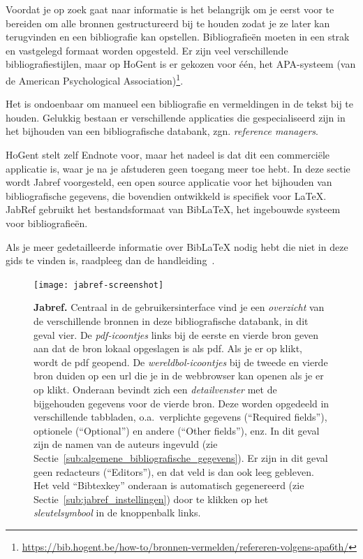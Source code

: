 Voordat je op zoek gaat naar informatie is het belangrijk om je eerst voor te bereiden om alle bronnen gestructureerd bij te houden zodat je ze later kan terugvinden en een bibliografie kan opstellen. Bibliografieën moeten in een strak en vastgelegd formaat worden opgesteld. Er zijn veel verschillende bibliografiestijlen, maar op HoGent is er gekozen voor één, het APA-systeem (van de American Psychological Association)\footnote{\url{https://bib.hogent.be/how-to/bronnen-vermelden/refereren-volgens-apa6th/}}.

Het is ondoenbaar om manueel een bibliografie en vermeldingen in de tekst bij te houden.  Gelukkig bestaan er verschillende applicaties die gespecialiseerd zijn in het bijhouden van een bibliografische databank, zgn. \emph{reference managers}.

HoGent stelt zelf Endnote voor, maar het nadeel is dat dit een commerciële applicatie is, waar je na je afstuderen geen toegang meer toe hebt. In deze sectie wordt Jabref voorgesteld, een open source applicatie voor het bijhouden van bibliografische gegevens, die bovendien ontwikkeld is specifiek voor {\LaTeX}. JabRef gebruikt het bestandsformaat van Bib{\LaTeX}, het ingebouwde systeem voor bibliografieën.

Als je meer gedetailleerde informatie over Bib{\LaTeX} nodig hebt die niet in deze gids te vinden is, raadpleeg dan de handleiding~\autocite{LehmanEtAl2016}.

\begin{figure}
  \centering
  \texttt{[image: jabref-screenshot]}
  \caption[Jabref]{\textbf{Jabref.} Centraal in de gebruikersinterface vind je een \emph{overzicht} van de verschillende bronnen in deze bibliografische databank, in dit geval vier. De \emph{pdf-icoontjes} links bij de eerste en vierde bron geven aan dat de bron lokaal opgeslagen is als pdf. Als je er op klikt, wordt de pdf geopend. De \emph{wereldbol-icoontjes} bij de tweede en vierde bron duiden op een url die je in de webbrowser kan openen als je er op klikt. Onderaan bevindt zich een \emph{detailvenster} met de bijgehouden gegevens voor de vierde bron. Deze worden opgedeeld in verschillende tabbladen, o.a.~verplichte gegevens (``Required fields''), optionele (``Optional'') en andere (``Other fields''), enz. In dit geval zijn de namen van de auteurs ingevuld (zie Sectie~\ref{sub:algemene_bibliografische_gegevens}). Er zijn in dit geval geen redacteurs (``Editors''), en dat veld is dan ook leeg gebleven. Het veld ``Bibtexkey'' onderaan is automatisch gegenereerd (zie Sectie~\ref{sub:jabref_instellingen}) door te klikken op het \emph{sleutelsymbool} in de knoppenbalk links.}
  \label{fig:jabref}
\end{figure}

